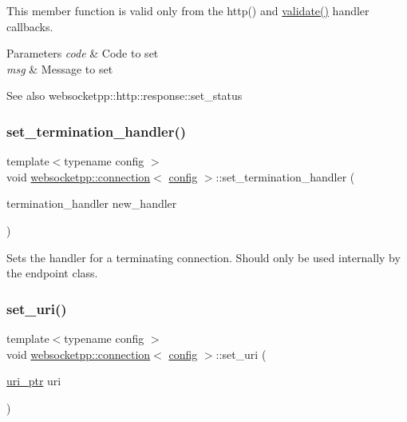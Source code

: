 This member function is valid only from the http() and \mbox{\hyperlink{authority_8hpp_a98696231ed7d6f1c166797053cebc5eb}{validate()}} handler callbacks.


\begin{DoxyParams}{Parameters}
{\em code} & Code to set \\
\hline
{\em msg} & Message to set \\
\hline
\end{DoxyParams}
\begin{DoxySeeAlso}{See also}
websocketpp\+::http\+::response\+::set\+\_\+status 
\end{DoxySeeAlso}
\mbox{\label{classwebsocketpp_1_1connection_ac72ff8473d0a49bb069825e99e99ca9d}} 
\subsubsection{\texorpdfstring{set\+\_\+termination\+\_\+handler()}{set\_termination\_handler()}}
{\footnotesize\ttfamily template$<$typename config $>$ \\
void \mbox{\hyperlink{classwebsocketpp_1_1connection}{websocketpp\+::connection}}$<$ \mbox{\hyperlink{classconfig}{config}} $>$\+::set\+\_\+termination\+\_\+handler (\begin{DoxyParamCaption}\item[{termination\+\_\+handler}]{new\+\_\+handler }\end{DoxyParamCaption})}

Sets the handler for a terminating connection. Should only be used internally by the endpoint class. \mbox{\label{classwebsocketpp_1_1connection_ac5c81acf3be998662a3500a9be2c4d38}} 
\subsubsection{\texorpdfstring{set\+\_\+uri()}{set\_uri()}}
{\footnotesize\ttfamily template$<$typename config $>$ \\
void \mbox{\hyperlink{classwebsocketpp_1_1connection}{websocketpp\+::connection}}$<$ \mbox{\hyperlink{classconfig}{config}} $>$\+::set\+\_\+uri (\begin{DoxyParamCaption}\item[{\mbox{\hyperlink{namespacewebsocketpp_aae370ea5ac83a8ece7712cb39fc23f5b}{uri\+\_\+ptr}}}]{uri }\end{DoxyParamCaption})}



